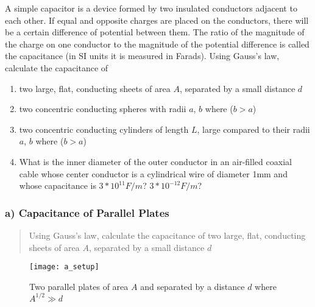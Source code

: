 \begin{question}

  A simple capacitor is a device formed by two insulated conductors
  adjacent to each other. If equal and opposite charges are placed on
  the conductors, there will be a certain difference of potential
  between them. The ratio of the magnitude of the charge on one
  conductor to the magnitude of the potential difference is called the
  capacitance (in SI units it is measured in Farads). Using Gauss's
  law, calculate the capacitance of

  \begin{enumerate}[label=\alph*]

  \item two large, flat, conducting sheets of area $A$, separated by a
    small distance $d$

  \item two concentric conducting spheres with radii $a$, $b$ where
    ($b > a$)

  \item two concentric conducting cylinders of length $L$, large
    compared to their radii $a$, $b$ where ($b > a$)

  \item What is the inner diameter of the outer conductor in an
    air-filled coaxial cable whose center conductor is a cylindrical
    wire of diameter 1mm and whose capacitance is $3 * 10^{11} F/m$?
    $3 * 10^{-12} F/m$?

  \end{enumerate}

\end{question}



\subsubsection*{a) Capacitance of Parallel Plates}
\begin{quote}
  Using Gauss's law, calculate the capacitance of two large, flat,
  conducting sheets of area $A$, separated by a small distance $d$
\end{quote}

\begin{figure}
  \begin{center}
    \texttt{[image: a\_setup]}
    \caption{Two parallel plates of area $A$ and separated by a
      distance $d$ where $A^{1/2} \gg d$}
    \label{fig:1:6:a:setup}
  \end{center}
\end{figure}

